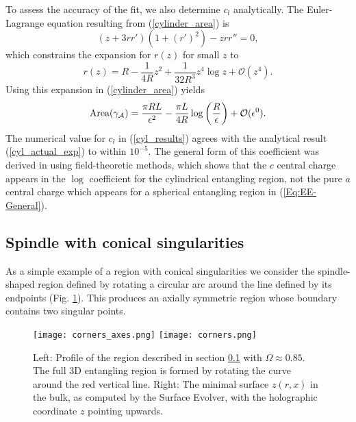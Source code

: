 \documentclass[11 pt]{article}
\def\be{\begin{equation}}
\def\ee{\end{equation}}
\begin{document}
To assess the accuracy of the fit, we also determine $c_l$ analytically. The Euler-Lagrange equation resulting from (\ref{cylinder_area}) is
\begin{equation}\label{cylinder_EL}
    (z+3rr')(1+(r')^2)-zrr''=0,
\end{equation}
which constrains the expansion for $r(z)$ for small $z$ to
\be\label{Eq:r-z-expansion}
r(z)=R-\frac{1}{4R}z^2+\frac{1}{32R^3}z^4\log z+\mathcal{O}(z^4).
\ee
Using this expansion in (\ref{cylinder_area}) yields 
\begin{equation}\label{cyl_actual_exp}
    \text{Area}(\gamma_{\cal A}) = \frac{\pi R L}{\epsilon^2} - \frac{\pi L}{4 R}\log\left(\frac{R}{\epsilon}\right) + \mathcal{O}(\epsilon^0).
\end{equation}
The numerical value for $c_l$ in (\ref{cyl_results}) agrees with the analytical result (\ref{cyl_actual_exp}) to within $10^{-5}$. The general form of this coefficient was derived in \cite{Solodukhin:2008dh} using field-theoretic methods, which shows that the $c$ central charge appears in the $\log$ coefficient for the cylindrical entangling region, not the pure $a$ central charge which appears for a spherical entangling region in (\ref{Eq:EE-General}).

\subsection{Spindle with conical singularities} \label{subsec:singular}

As a simple example of a region with conical singularities we consider the spindle-shaped region defined by rotating a circular arc around the line defined by its endpoints (Fig. \ref{fig:corners}). This produces an axially symmetric region whose boundary contains two singular points.

\begin{figure}
     \centering
         \texttt{[image: corners\_axes.png]}
     \qquad
         \texttt{[image: corners.png]}
        \caption{Left: Profile of the region described in section \ref{subsec:singular} with $\Omega\approx 0.85$. The full 3D entangling region is formed by rotating the curve around the red vertical line. Right: The minimal surface $z(r,x)$ in the bulk, as computed by the Surface Evolver, with the holographic coordinate $z$ pointing upwards.}
        \label{fig:corners}
\end{figure}
\end{document}
